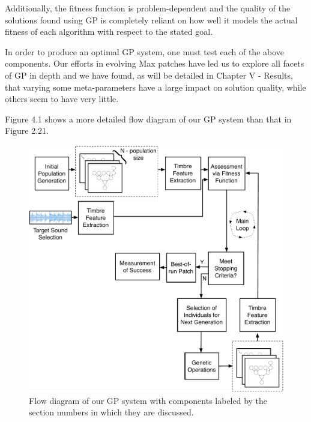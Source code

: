 \documentclass[12pt]{report} 	%
\numberwithin{figure}{chapter}
\numberwithin{table}{chapter}
\numberwithin{equation}{chapter}
\begin{document}
\begin{flushleft}
Additionally, the fitness function is problem-dependent and the quality of the solutions found using GP is completely reliant on how well it models the actual fitness of each algorithm with respect to the stated goal.

In order to produce an optimal GP system, one must test each of the above components. Our efforts in evolving Max patches have led us to explore all facets of GP in depth and we have found, as will be detailed in Chapter V - Results, that varying some meta-parameters have a large impact on solution quality, while others seem to have very little. 

Figure 4.1 shows a more detailed flow diagram of our GP system than that in Figure 2.21.
\begin{figure}[h!]
\begin{center}
\includegraphics[scale=0.5]{OverallGPSystem}
\caption[Flow diagram of overall GP system]{Flow diagram of our GP system with components labeled by the section numbers in which they are discussed.}
\end{center}
\end{figure}

\end{flushleft}
\end{document}
